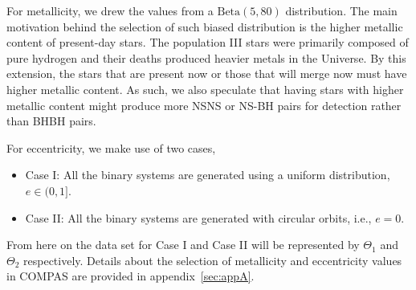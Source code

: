 \documentclass[journal, twocolumns]{IEEEtran}
\begin{document}
    For metallicity, we drew the values from a $\text{Beta}(5, 80)$ distribution.
    The main motivation behind the selection of such biased distribution is the higher metallic content of present-day stars.
    The population III stars were primarily composed of pure hydrogen and their deaths produced heavier metals in the Universe.
    By this extension, the stars that are present now or those that will merge now must have higher metallic content.
    As such, we also speculate that having stars with higher metallic content might produce more NSNS or NS-BH pairs for detection rather than BHBH pairs.

    For eccentricity, we make use of two cases,
    \begin{itemize}
        \item Case I: All the binary systems are generated using a uniform distribution, $e \in (0, 1]$.
        \item Case II: All the binary systems are generated with circular orbits, i.e., $e = 0$.
    \end{itemize}

	From here on the data set for Case I and Case II will be represented by $\Theta_1$ and $\Theta_2$ respectively.
    Details about the selection of metallicity and eccentricity values in COMPAS are provided in appendix~\ref{sec:appA}.
\end{document}
